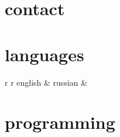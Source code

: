 %
%
%
%
%
%








\begin{aside} %
	\section{contact}
	
	\section{languages}
	\begin{tabular}{r r}
		english & \score{4}
		russian & 
	\end{tabular}
	\section{programming}
	
\end{aside}






